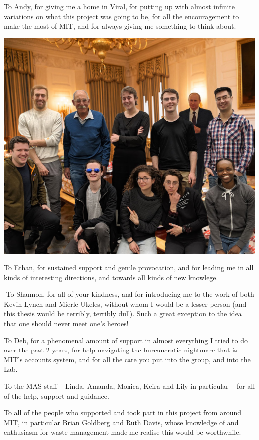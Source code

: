\documentclass[nofonts,nols,justified,nobib]{tufte-book}
\begin{document}
To Andy, for giving me a home in Viral, for putting up with almost infinite variations on what this project was going to be, for all the encouragement to make the most of MIT, and for always giving me something to think about. 

\begin{marginfigure}
\includegraphics[width=\textwidth]{img/1/viral.jpg}
\end{marginfigure}

To Ethan, for sustained support and gentle provocation, and for leading me in all kinds of interesting directions, and towards all kinds of new knowlege.

 To Shannon, for all of your kindness, and for introducing me to the work of both Kevin Lynch and Mierle Ukeles, without whom I would be a lesser person (and this thesis would be terribly, terribly dull). Such a great exception to the idea that one should never meet one's heroes!

To Deb, for a phenomenal amount of support in almost everything I tried to do over the past 2 years, for help navigating the bureaucratic nightmare that is MIT’s accounts system, and for all the care you put into the group, and into the Lab.

To the MAS staff -- Linda, Amanda, Monica, Keira and Lily in particular -- for all of the help, support and guidance.

To all of the people who supported and took part in this project from around MIT, in particular Brian Goldberg and Ruth Davis, whose knowledge of and enthusiasm for waste management made me realise this would be worthwhile.
\end{document}
